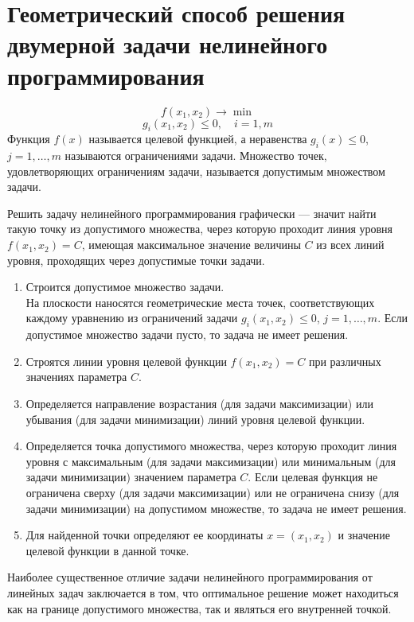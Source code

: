 \documentclass[17pt]{extarticle}
\begin{document}
\section{Геометрический способ решения двумерной задачи нелинейного программирования}
\[
    f(x_1, x_2) \to \min
\]
\[
    g_i(x_1, x_2) \leq 0, \quad i = 1, m
\]
Функция \( f(x) \) называется целевой функцией, а неравенства \( g_i(x) \leq 0 \), \( j = 1, \ldots, m \) называются ограничениями задачи.
Множество точек, удовлетворяющих ограничениям задачи, называется допустимым множеством задачи.

Решить задачу нелинейного программирования графически — значит найти такую точку из допустимого множества,
через которую проходит линия уровня \( f(x_1, x_2) = C \), имеющая максимальное значение величины \( C \) из всех линий уровня,
проходящих через допустимые точки задачи.

\begin{enumerate}
    \item Строится допустимое множество задачи. \\ На плоскости наносятся геометрические места точек,
          соответствующих каждому уравнению из ограничений задачи \( g_i(x_1, x_2) \leq 0 \), \( j = 1, \ldots, m \).
          Если допустимое множество задачи пусто, то задача не имеет решения.

    \item Строятся линии уровня целевой функции \( f(x_1, x_2) = C \) при различных значениях параметра \( C \).

    \item Определяется направление возрастания (для задачи максимизации) или убывания (для задачи минимизации) линий уровня целевой функции.

    \item Определяется точка допустимого множества, через которую проходит линия уровня с максимальным (для задачи максимизации)
          или минимальным (для задачи минимизации) значением параметра \( C \). Если целевая функция не ограничена сверху (для задачи максимизации)
          или не ограничена снизу (для задачи минимизации) на допустимом множестве, то задача не имеет решения.

    \item Для найденной точки определяют ее координаты \( x = (x_1, x_2) \) и значение целевой функции в данной точке.
\end{enumerate}

Наиболее существенное отличие задачи
нелинейного программирования от линейных задач
заключается в том, что оптимальное решение может
находиться как на границе допустимого множества,
так и являться его внутренней точкой.
\end{document}
